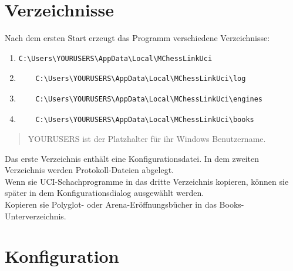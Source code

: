 \documentclass[11pt,a4paper]{article}
\begin{document}
\section{Verzeichnisse}
Nach dem ersten Start erzeugt das Programm verschiedene Verzeichnisse:
\begin{enumerate}
	\item \begin{verbatim}
C:\Users\YOURUSERS\AppData\Local\MChessLinkUci
	\end{verbatim} 
	\item\begin{verbatim}
	C:\Users\YOURUSERS\AppData\Local\MChessLinkUci\log
	\end{verbatim} 
	\item \begin{verbatim}
	C:\Users\YOURUSERS\AppData\Local\MChessLinkUci\engines
	\end{verbatim} 	
		\item \begin{verbatim}
	C:\Users\YOURUSERS\AppData\Local\MChessLinkUci\books
	\end{verbatim} 	
\end{enumerate}
\begin{quote}
YOURUSERS ist der Platzhalter für ihr Windows Benutzername.
\end{quote}

Das erste Verzeichnis enthält eine Konfigurationsdatei. In dem zweiten Verzeichnis werden Protokoll-Dateien abgelegt.\\Wenn sie UCI-Schachprogramme in das dritte Verzeichnis kopieren, können sie später in dem Konfigurationsdialog ausgewählt werden.\\Kopieren sie Polyglot- oder Arena-Eröffnungsbücher in das Books-Unterverzeichnis.

\section{Konfiguration}
\end{document}
